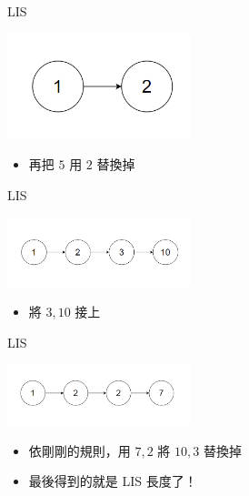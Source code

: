 \documentclass[aspectratio=169]{beamer}
\begin{document}
    \begin{frame}{LIS}
        \begin{center}
            \includegraphics[width=0.4\textwidth]{img/LIS-7.png}
        \end{center}

        \begin{itemize}
            \item 再把 $5$ 用 $2$ 替換掉
        \end{itemize}
    \end{frame}

    \begin{frame}{LIS}
        \begin{center}
            \includegraphics[width=0.4\textwidth]{img/LIS-8.png}
        \end{center}

        \begin{itemize}
            \item 將 $3, 10$ 接上
        \end{itemize}
    \end{frame}

    \begin{frame}{LIS}
        \begin{center}
            \includegraphics[width=0.4\textwidth]{img/LIS-9.png}
        \end{center}

        \begin{itemize}
            \item 依剛剛的規則，用 $7, 2$ 將 $10, 3$ 替換掉
            \item 最後得到的就是 LIS 長度了！
        \end{itemize}
    \end{frame}
\end{document}
